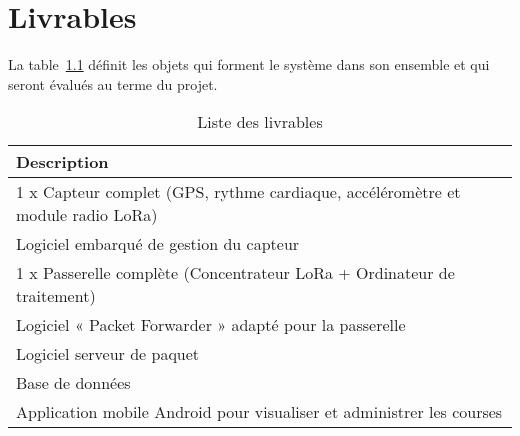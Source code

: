 \clearpage
\pagestyle{fancy}
\chapter{Livrables}

La table~\ref{tab:livrables} définit les objets qui forment le système dans son ensemble et qui seront évalués au terme du projet. 

\begin{table}[htb]
\caption[Livrable]{Liste des livrables}
\label{tab:livrables}
\centering
\begin{tabular}{l}
\toprule
Description \\
\midrule
1 x Capteur complet (GPS, rythme cardiaque, accéléromètre et module radio LoRa)  \\
Logiciel embarqué de gestion du capteur \\
1 x Passerelle complète (Concentrateur LoRa + Ordinateur de traitement) \\
Logiciel « Packet Forwarder » adapté pour la passerelle \\
Logiciel serveur de paquet \\
Base de données \\
Application mobile Android pour visualiser et administrer les courses \\
\bottomrule 
\end{tabular}
\end{table}